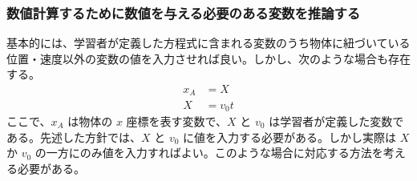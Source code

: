 \subsubsection*{数値計算するために数値を与える必要のある変数を推論する}
基本的には、学習者が定義した方程式に含まれる変数のうち物体に紐づいている位置・速度以外の変数の値を入力させれば良い。しかし、次のような場合も存在する。
\begin{align*}
x_A &= X \\
X &= v_0t
\end{align*}
ここで、$x_A$ は物体の $x$ 座標を表す変数で、$X$ と $v_0$ は学習者が定義した変数である。先述した方針では、$X$ と $v_0$ に値を入力する必要がある。しかし実際は $X$ か $v_0$ の一方にのみ値を入力すればよい。このような場合に対応する方法を考える必要がある。